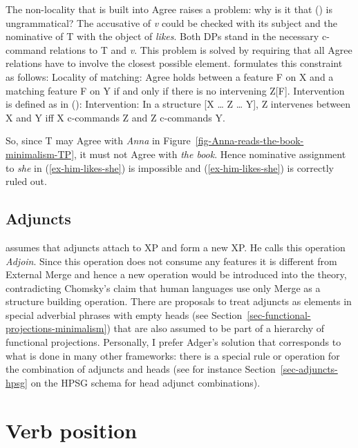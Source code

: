 The non-locality that is built into Agree raises a problem: why is it that () is
ungrammatical?
\z
The accusative of \textit{v} could be checked with its subject and the nominative of T with the
object of \emph{likes}. Both DPs stand in the necessary c-command relations to T and \textit{v}. This
problem is solved by requiring that all Agree relations have to involve the closest possible
element. \citet[]{Adger2003a} formulates this constraint as follows:
\ea
\label{principle-locality-of-matching}
Locality of matching: Agree holds between a feature F on X and a matching feature F on Y if and only
if there is no intervening Z[F].
\z
Intervention is defined as in ():
\ea
\label{def-intervention}
Intervention: In a structure [X \ldots{} Z \ldots{} Y], Z intervenes between X and Y iff X
c-commands Z and Z c-commands Y.
\z

\largerpage
\noindent
So, since T may Agree with \emph{Anna} in Figure~\ref{fig-Anna-reads-the-book-minimalism-TP}, it must not Agree with \emph{the book}. Hence
nominative assignment to \emph{she} in (\ref{ex-him-likes-she}) is impossible and (\ref{ex-him-likes-she}) is correctly ruled out.

\subsection{Adjuncts}

\citet[Section~4.2.3]{Adger2003a} assumes that adjuncts attach to XP and form a new XP. He calls
this operation \emph{Adjoin}. Since this operation does not consume any features it is different from
External Merge and hence a new operation would be introduced into the theory, contradicting
Chomsky's claim that human languages use only Merge as a structure building
operation. There are
proposals to treat adjuncts as elements in special adverbial phrases with empty heads (see
Section~\ref{sec-functional-projections-minimalism}) that are also assumed to be part of a hierarchy of functional
projections. Personally, I prefer Adger's solution that corresponds to what is done in many other
frameworks: there is a special rule or operation for the combination of adjuncts and heads (see for instance
Section~\ref{sec-adjuncts-hpsg} on the HPSG schema for head adjunct combinations).


\section{Verb position}
\label{sec-verb-position-MP}

